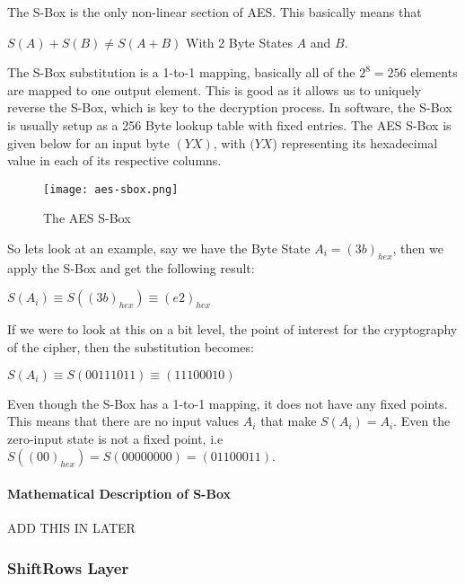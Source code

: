 The S-Box is the only non-linear section of AES. This basically means that

\begin{center}
$S(A) + S(B) \neq S(A + B)$
With 2 Byte States $A$ and $B$.
\end{center}

The S-Box substitution is a 1-to-1 mapping, basically all of the $2^8 = 256$ elements are mapped to one output element. This is good as it allows us to uniquely reverse the S-Box, which is key to the decryption process. In software, the S-Box is usually setup as a 256 Byte lookup table with fixed entries. The AES S-Box is given below for an input byte $(YX)$, with $(YX$) representing its hexadecimal value in each of its respective columns.

\begin{figure}[H]
\begin{center}
\texttt{[image: aes-sbox.png]}
\end{center}
\caption{The AES S-Box}
\label{AES-S-BOX}
\end{figure}

So lets look at an example, say we have the Byte State $A_i = (3b)_{hex}$, then we apply the S-Box and get the following result:

\begin{center}
$S(A_i) \equiv S((3b)_{hex}) \equiv (e2)_{hex}$
\end{center}

If we were to look at this on a bit level, the point of interest for the cryptography of the cipher, then the substitution becomes:

\begin{center}
$S(A_i) \equiv S(00111011) \equiv (11100010)$
\end{center}

Even though the S-Box has a 1-to-1 mapping, it does not have any fixed points. This means that there are no input values $A_i$ that make $S(A_i) = A_i$. Even the zero-input state is not a fixed point, i.e $S((00)_{hex}) = S(00000000) = (01100011)$.

\paragraph{Mathematical Description of S-Box}

\begin{center}
ADD THIS IN LATER
\end{center}

\subsubsection{ShiftRows Layer}

